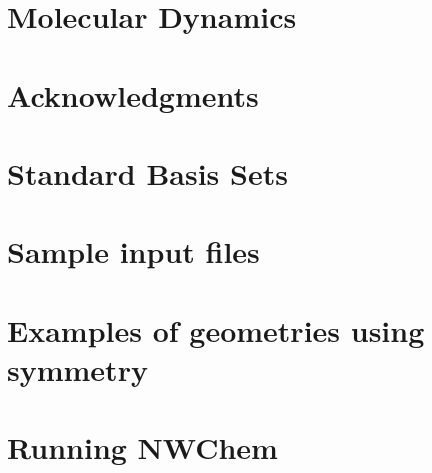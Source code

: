 \section{Molecular Dynamics}


\section{Acknowledgments}


\appendix

\section{Standard Basis Sets}


\section{Sample input files}


\section{Examples of geometries using symmetry}


\section{Running NWChem}



